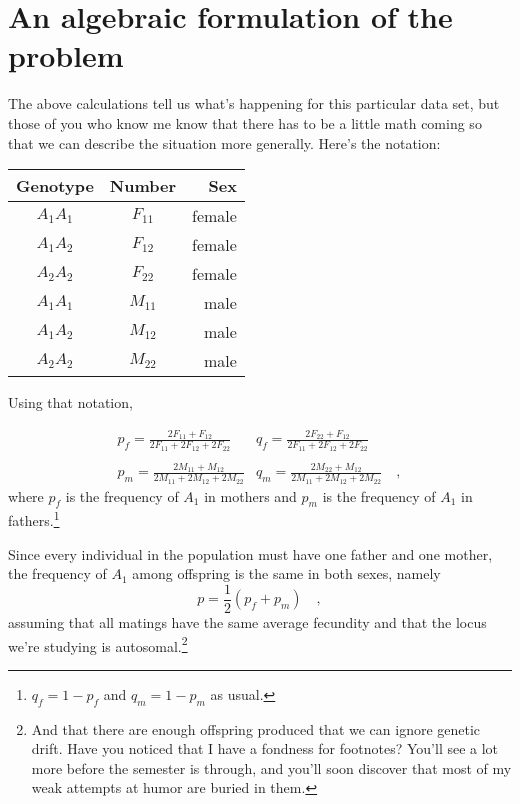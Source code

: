 \documentclass[12pt]{article}
\begin{document}
\section*{An algebraic formulation of the problem}

The above calculations tell us what's happening for this particular
data set, but those of you who know me know that there has to be a
little math coming so that we can describe the situation more
generally. Here's the notation:

\begin{center}
\begin{tabular}{ccr}
\hline\hline
Genotype & Number & Sex \\
\hline
$A_1A_1$ & $F_{11}$ & female \\
$A_1A_2$ & $F_{12}$ & female \\
$A_2A_2$ & $F_{22}$ & female \\
$A_1A_1$ & $M_{11}$ & male \\
$A_1A_2$ & $M_{12}$ & male \\
$A_2A_2$ & $M_{22}$ & male \\
\hline
\end{tabular}
\end{center}

\noindent Using that notation, 

$$\begin{array}{cc}
p_f = \frac{2F_{11}+F_{12}}{2F_{11}+2F_{12}+2F_{22}} &
q_f = \frac{2F_{22}+F_{12}}{2F_{11}+2F_{12}+2F_{22}} \\
 & \\
p_m = \frac{2M_{11}+M_{12}}{2M_{11}+2M_{12}+2M_{22}} &
q_m = \frac{2M_{22}+M_{12}}{2M_{11}+2M_{12}+2M_{22}} \quad ,
\end{array}$$
where $p_f$ is the frequency of $A_1$ in mothers and $p_m$ is the
frequency of $A_1$ in fathers.\footnote{$q_f = 1 - p_f$ and $q_m = 1 -
  p_m$ as usual.}

Since every individual in the population must have one father and one
mother, the frequency of $A_1$ among offspring is the same in both
sexes, namely
\[
p = \frac{1}{2}(p_f + p_m) \quad ,
\]
assuming that all matings have the same average fecundity and that the
locus we're studying is autosomal.\footnote{And that there are enough
  offspring produced that we can ignore genetic drift. Have you
  noticed that I have a fondness for footnotes? You'll see a lot more
  before the semester is through, and you'll soon discover that most
  of my weak attempts at humor are buried in them.}
\end{document}
